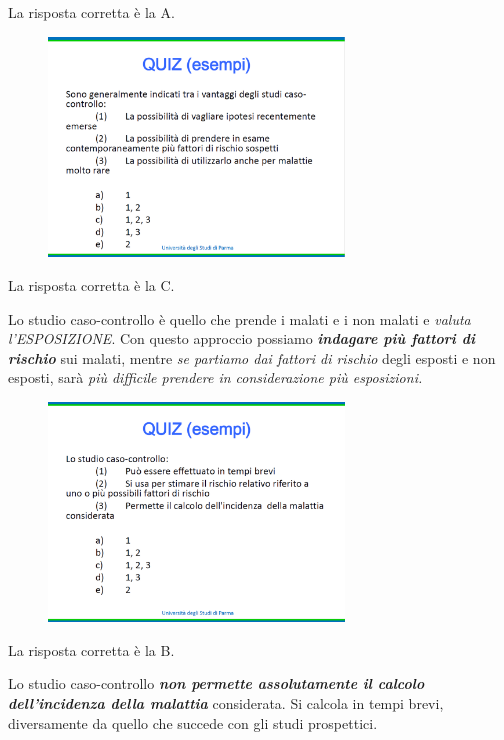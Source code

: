La risposta corretta è la A.

\begin{figure}[!ht]
\centering
\includegraphics[width=0.7\textwidth]{05/image4.png}
\end{figure}

La risposta corretta è la C.

Lo studio caso-controllo è quello che prende i malati e i non malati e \emph{valuta l'ESPOSIZIONE}. Con questo approccio possiamo \textbf{\emph{indagare più fattori di rischio}} sui malati, mentre \emph{se partiamo dai fattori di rischio} degli esposti e non esposti, sarà \emph{più difficile prendere in considerazione più esposizioni.}

\begin{figure}[!ht]
\centering
\includegraphics[width=0.7\textwidth]{05/image5.png}
\end{figure}

La risposta corretta è la B.

Lo studio caso-controllo \textbf{\emph{non permette assolutamente il calcolo dell'incidenza della malattia}} considerata. Si calcola in tempi brevi, diversamente da quello che succede con gli studi prospettici.

